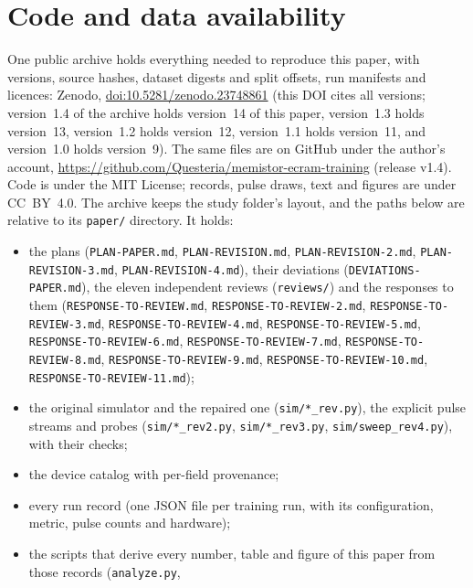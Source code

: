 








\section{Code and data availability}\label{sec:availability}
\begin{sloppypar}
One public archive holds everything needed to reproduce this paper, with versions, source hashes, dataset digests and split
offsets, run manifests and licences: Zenodo, \href{https://doi.org/10.5281/zenodo.23748861}{doi:10.5281/zenodo.23748861}
(this DOI cites all versions; version~1.4 of the archive holds version~14 of this paper, version~1.3 holds version~13,
version~1.2 holds version~12, version~1.1 holds version~11, and version~1.0 holds version~9). The same files are on GitHub under
the author's account, \url{https://github.com/Questeria/memistor-ecram-training} (release v1.4). Code is under the MIT License; records, pulse draws, text and
figures are under CC~BY~4.0. The archive keeps the study folder's layout, and the paths below are relative to its
\texttt{paper/} directory. It holds:
\begin{itemize}
\item the plans (\texttt{PLAN-PAPER.md}, \texttt{PLAN-REVISION.md}, \texttt{PLAN-REVISION-2.md},
      \texttt{PLAN-REVISION-3.md}, \texttt{PLAN-REVISION-4.md}), their deviations (\texttt{DEVIATIONS-PAPER.md}), the eleven independent reviews
      (\texttt{reviews/}) and the responses to them (\texttt{RESPONSE-TO-REVIEW.md}, \texttt{RESPONSE-TO-REVIEW-2.md},
      \texttt{RESPONSE-TO-REVIEW-3.md}, \texttt{RESPONSE-TO-REVIEW-4.md}, \texttt{RESPONSE-TO-REVIEW-5.md}, \texttt{RESPONSE-TO-REVIEW-6.md}, \texttt{RESPONSE-TO-REVIEW-7.md}, \texttt{RESPONSE-TO-REVIEW-8.md}, \texttt{RESPONSE-TO-REVIEW-9.md}, \texttt{RESPONSE-TO-REVIEW-10.md}, \texttt{RESPONSE-TO-REVIEW-11.md});
\item the original simulator and the repaired one (\texttt{sim/*\_rev.py}), the explicit pulse streams and probes
      (\texttt{sim/*\_rev2.py}, \texttt{sim/*\_rev3.py}, \texttt{sim/sweep\_rev4.py}), with their checks;
\item the device catalog with per-field provenance;
\item every run record (one JSON file per training run, with its configuration, metric, pulse counts and hardware);
\item the scripts that derive every number, table and figure of this paper from those records (\texttt{analyze.py},

\end{itemize}
\end{sloppypar}
